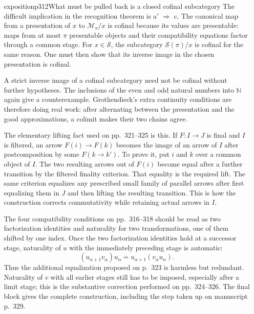 \begin{dcomment}{exposition}{p312}{What must be pulled back is a closed cofinal subcategory}
The difficult implication in the recognition theorem is a$'$ $\Rightarrow$ c. The canonical map from a presentation of $x$ to $\mathcal M_\pi/x$ is cofinal because its values are presentable: maps from at most $\pi$ presentable objects and their compatibility equations factor through a common stage. For $x\in\mathcal S$, the subcategory $\mathcal S(\pi)/x$ is cofinal for the same reason. One must then show that its inverse image in the chosen presentation is cofinal.

A strict inverse image of a cofinal subcategory need not be cofinal without further hypotheses. The inclusions of the even and odd natural numbers into $\mathbb N$ again give a counterexample. Grothendieck's extra continuity conditions are therefore doing real work: after alternating between the presentation and the good approximations, a colimit makes their two chains agree.

The elementary lifting fact used on pp.~321--325 is this. If $F:I\to J$ is final and $I$ is filtered, an arrow $F(i)\to F(k)$ becomes the image of an arrow of $I$ after postcomposition by some $F(k\to k')$. To prove it, put $i$ and $k$ over a common object of $I$. The two resulting arrows out of $F(i)$ become equal after a further transition by the filtered finality criterion. That equality is the required lift. The same criterion equalizes any prescribed small family of parallel arrows after first equalizing them in $J$ and then lifting the resulting transition. This is how the construction corrects commutativity while retaining actual arrows in $I$.

The four compatibility conditions on pp.~316--318 should be read as two factorization identities and naturality for two transformations, one of them shifted by one index. Once the two factorization identities hold at a successor stage, naturality of $u$ with the immediately preceding stage is automatic:
\[
 (u_{\alpha+1}v_\alpha)u_\alpha
   =u_{\alpha+1}(v_\alpha u_\alpha).
\]
Thus the additional equalization proposed on p.~323 is harmless but redundant. Naturality of $v$ with all earlier stages still has to be imposed, especially after a limit stage; this is the substantive correction performed on pp.~324--326. The final block gives the complete construction, including the step taken up on manuscript p.~329.
\end{dcomment}

